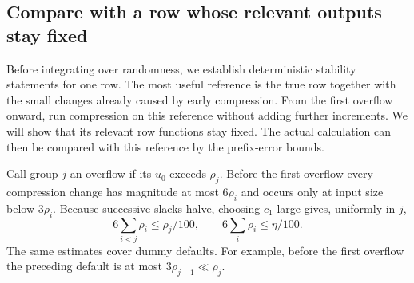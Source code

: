 \documentclass[11pt]{article}
\numberwithin{equation}{section}
\theoremstyle{definition}
\theoremstyle{remark}
\begin{document}
\subsection{Compare with a row whose relevant outputs stay fixed}

Before integrating over randomness, we establish deterministic stability statements for one row. The most useful reference is the true row together with the small changes already caused by early compression. From the first overflow onward, run compression on this reference without adding further increments. We will show that its relevant row functions stay fixed. The actual calculation can then be compared with this reference by the prefix-error bounds.

Call group $j$ an overflow if its $u_0$ exceeds $\rho_j$.  Before the first
overflow every compression change has magnitude at most $6\rho_i$ and
occurs only at input size below $3\rho_i$.  Because successive slacks
halve, choosing $c_1$ large gives, uniformly in $j$,
\begin{equation}
 6\sum_{i<j}\rho_i\leq\rho_j/100,
 \qquad 6\sum_i\rho_i\leq\eta/100.
 \label{eq:buf-small-floors}
\end{equation}
The same estimates cover dummy defaults.  For example, before the first
overflow the preceding default is at most $3\rho_{j-1}\ll\rho_j$.
\end{document}
